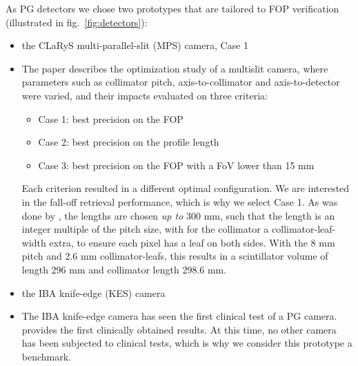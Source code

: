 \documentclass[a4paper,english]{article}
\begin{document}
As PG detectors we chose two prototypes that are tailored to FOP verification (illustrated in fig.~\ref{fig:detectors}):
\begin{itemize}[noitemsep]
\item the CLaRyS multi-parallel-slit (MPS) camera, Case 1 \citep{Pinto2014a}
\item[] The paper describes the optimization study of a multislit camera, where parameters such as collimator pitch, axis-to-collimator and axis-to-detector were varied, and their impacts evaluated on three criteria: 
\begin{itemize}[noitemsep]
\item Case 1: best precision on the FOP
\item Case 2: best precision on the profile length
\item Case 3: best precision on the FOP with a FoV lower than 15 mm
\end{itemize}
Each criterion resulted in a different optimal configuration. We are interested in the fall-off retrieval performance, which is why we select Case 1. As was done by \cite{Pinto2014a}, the lengths are chosen \emph{up to} 300 mm, such that the length is an integer multiple of the pitch size, with for the collimator a collimator-leaf-width extra, to ensure each pixel has a leaf on both sides. With the 8 mm pitch and 2.6 mm collimator-leafs, this results in a scintillator volume of length 296 mm and collimator length 298.6 mm.
\item the IBA knife-edge (KES) camera \citep{Perali2014,Sterpin2015}
\item[] The IBA knife-edge camera has seen the first clinical test of a PG camera. \cite{Richter2016} provides the first clinically obtained results. At this time, no other camera has been subjected to clinical tests, which is why we consider this prototype a benchmark.
\end{itemize}
\end{document}
